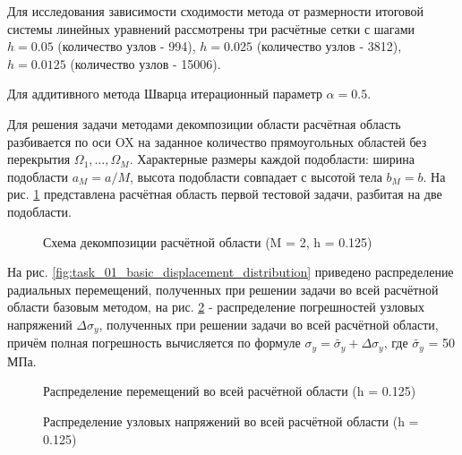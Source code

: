 \documentclass[a4paper, 14pt]{extarticle}
\newcommand{\area}{rectangle}
\newcommand{\task}{3_fixes}
\newcommand{\taskNum}{01}
\begin{document}
Для исследования зависимости сходимости метода от размерности итоговой системы линейных уравнений рассмотрены три расчётные сетки с шагами $h = 0.05$ (количество узлов - 994), $h = 0.025$ (количество узлов - 3812), $h = 0.0125$ (количество узлов - 15006).

Для аддитивного метода Шварца итерационный параметр $\alpha = 0.5$.

\newpage

Для решения задачи методами декомпозиции области расчётная область разбивается по оси OX на заданное количество прямоугольных областей без перекрытия $\Omega_1, \ldots, \Omega_M$. Характерные размеры каждой подобласти: ширина подобласти $a_M = a / M$, высота подобласти совпадает с высотой тела $b_M = b$. На рис. \ref{fig:task_\taskNum_decomposition} представлена расчётная область первой тестовой задачи, разбитая на две подобласти.

\begin{figure}[h]
\caption{Схема декомпозиции расчётной области (M = 2, h = 0.125)}
\label{fig:task_\taskNum_decomposition}
\end{figure}

\newpage

На рис. \ref{fig:task_\taskNum_basic_displacement_distribution} приведено распределение радиальных перемещений, полученных при решении задачи во всей расчётной области базовым методом, на рис. \ref{fig:task_\taskNum_basic_pressure_distribution_y} - распределение погрешностей узловых напряжений $\Delta\sigma_y$, полученных при решении задачи во всей расчётной области, причём полная погрешность вычисляется по формуле $\sigma_y = \tilde{\sigma_y} + \Delta \sigma_y$, где $\tilde{\sigma_y}$ = 50 МПа.

\begin{figure}[h]
\caption{Распределение перемещений во всей расчётной области (h = 0.125)}
\label{fig:task_\taskNum_basic_displacement_distribution}
\caption{Распределение узловых напряжений во всей расчётной области (h = 0.125)}
\label{fig:task_\taskNum_basic_pressure_distribution_y}
\end{figure}
\end{document}
